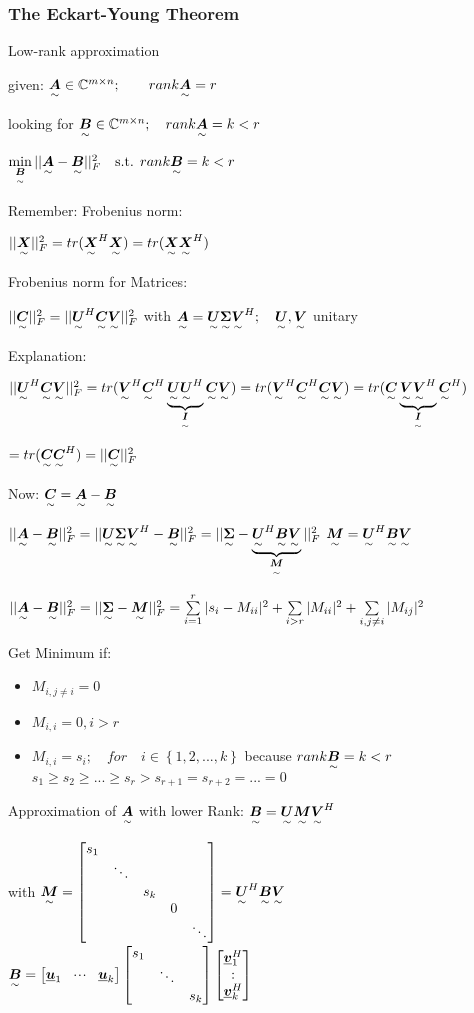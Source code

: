 \subsubsection{The Eckart-Young Theorem}
Low-rank approximation 

given: $\ma{A}\in \mathbb{C}^{m\times n};\qquad rank\ma{A}=r$

looking for $\ma{B}\in\mathbb{C}^{m\times n};\quad rank\ma{A}=k<r$

$\min\limits_{\ma{B}}||\ma{A}-\ma{B}||_F^2 \quad \textrm{s.t. } rank \ma{B}=k<r$

Remember: Frobenius norm: 

$||\ma{X}||_F^2=tr(\ma{X}^H\ma{X})=tr(\ma{X}\ma{X}^H)$ 

Frobenius norm for Matrices: 

$||\ma{C}||_F^2=||\ma{U}^H\ma{C}\ma{V}||_F^2$ \quad with \quad $\ma{A}=\ma{U}\ma{\Sigma}\ma{V}^H; \quad \ma{U},\ma{V}$ unitary

Explanation: 


$||\ma{U}^H\ma{C}\ma{V}||_F^2=tr(\ma{V}^H\ma{C}^H\underbrace{\ma{U}\ma{U}^H}_{\ma{I}}\ma{C}\ma{V})=tr(\ma{V}^H\ma{C}^H\ma{C}\ma{V})=tr(\ma{C}\underbrace{\ma{V}\ma{V}^H}_{\ma{I}}\ma{C}^H)$

$=tr(\ma{C}\ma{C}^H)=||\ma{C}||_F^2$


Now: $\ma{C}=\ma{A}-\ma{B}$

$||\ma{A}-\ma{B}||_F^2  =||\ma{U}\ma{\Sigma}\ma{V}^H-\ma{B}||_F^2  = ||\ma{\Sigma}-\underbrace{\ma{U}^H\ma{B}\ma{V}}_{\ma{M}}||_F^2$ \pfeil$\ma{M}=\ma{U}^H\ma{B}\ma{V}$

$||\ma{A}-\ma{B}||_F^2 =||\ma{\Sigma}-\ma{M}||_F^2
 = \sum\limits_{i=1}^r|s_i-M_{ii}|^2+\sum\limits_{i>r}|M_{ii}|^2+\sum\limits_{i,j\neq i}|M_{ij}|^2$
 
Get Minimum if:
\begin{itemize}
\item $M_{i,j\neq i}=0$
\item $M_{i,i}=0, i>r$
\item $M_{i,i}=s_i; \quad for\quad i\in\left\lbrace 1,2,...,k\right\rbrace$ \quad because \quad  $rank\ma{B}=k<r$
\\$s_1\geq s_2\geq ... \geq s_r > s_{r+1}=s_{r+2}=...=0$
\end{itemize}


Approximation of $\ma{A}$ with lower Rank: $\ma{B}=\ma{U}\ma{M}\ma{V}^H$

\quad with \quad $\ma{M}=
\mat{s_1 & & & &\\ & \ddots & & &\\ & & s_k & &\\ & & & 0 & \\ & & & & \ddots }
=\ma{U}^H\ma{B}\ma{V}$ \qquad
$\ma{B}=\mat{\vec{u}_1& \shdots & \vec{u}_k}\mat{s_1 & &\\ & \ddots &\\ & & s_k  }\mat{\vec{v}_1^H\\\svdots\\\vec{v}_k^H}$

